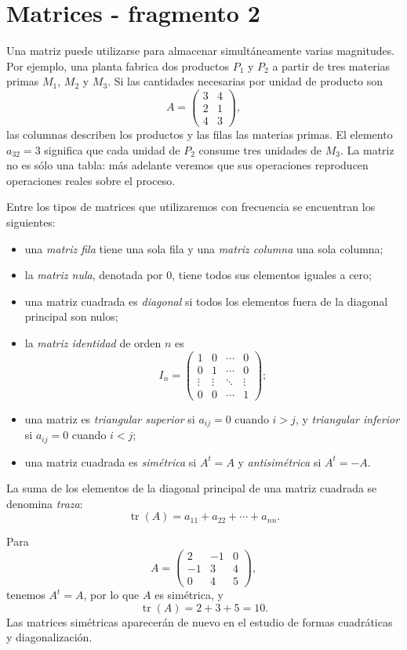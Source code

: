 \section{Matrices - fragmento 2}
Una matriz puede utilizarse para almacenar simultáneamente varias magnitudes. Por ejemplo, una planta fabrica dos productos $P_1$ y $P_2$ a partir de tres materias primas $M_1$, $M_2$ y $M_3$. Si las cantidades necesarias por unidad de producto son
\[
A=
\begin{pmatrix}
3&4\\
2&1\\
4&3
\end{pmatrix},
\]
las columnas describen los productos y las filas las materias primas. El elemento $a_{32}=3$ significa que cada unidad de $P_2$ consume tres unidades de $M_3$. La matriz no es sólo una tabla: más adelante veremos que sus operaciones reproducen operaciones reales sobre el proceso.

Entre los tipos de matrices que utilizaremos con frecuencia se encuentran los siguientes:

\begin{itemize}
\item una \emph{matriz fila} tiene una sola fila y una \emph{matriz columna} una sola columna;
\item la \emph{matriz nula}, denotada por $0$, tiene todos sus elementos iguales a cero;
\item una matriz cuadrada es \emph{diagonal} si todos los elementos fuera de la diagonal principal son nulos;
\item la \emph{matriz identidad} de orden $n$ es
\[
I_n=\begin{pmatrix}
1&0&\cdots&0\\
0&1&\cdots&0\\
\vdots&\vdots&\ddots&\vdots\\
0&0&\cdots&1
\end{pmatrix};
\]
\item una matriz es \emph{triangular superior} si $a_{ij}=0$ cuando $i>j$, y \emph{triangular inferior} si $a_{ij}=0$ cuando $i<j$;
\item una matriz cuadrada es \emph{simétrica} si $A^t=A$ y \emph{antisimétrica} si $A^t=-A$.
\end{itemize}

La suma de los elementos de la diagonal principal de una matriz cuadrada se denomina \emph{traza}:
\[
\operatorname{tr}(A)=a_{11}+a_{22}+\cdots+a_{nn}.
\]

\begin{example}
Para
\[
A=
\begin{pmatrix}
2&-1&0\\
-1&3&4\\
0&4&5
\end{pmatrix},
\]
tenemos $A^t=A$, por lo que $A$ es simétrica, y
\[
\operatorname{tr}(A)=2+3+5=10.
\]
Las matrices simétricas aparecerán de nuevo en el estudio de formas cuadráticas y diagonalización.
\end{example}


